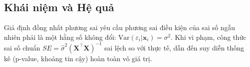 	\subsection{Khái niệm và Hệ quả}
	Giả định đồng nhất phương sai \cite{dobson2018} yêu cầu phương sai điều kiện của sai số ngẫu nhiên phải là một hằng số không đổi: $\text{Var}(\varepsilon_i | \mathbf{x}_i) = \sigma^2$. Khi vi phạm, công thức sai số chuẩn $SE = \hat{\sigma}^2(\mathbf{X}^\top\mathbf{X})^{-1}$ sai lệch so với thực tế, dẫn đến suy diễn thống kê (p-value, khoảng tin cậy) hoàn toàn vô giá trị.
